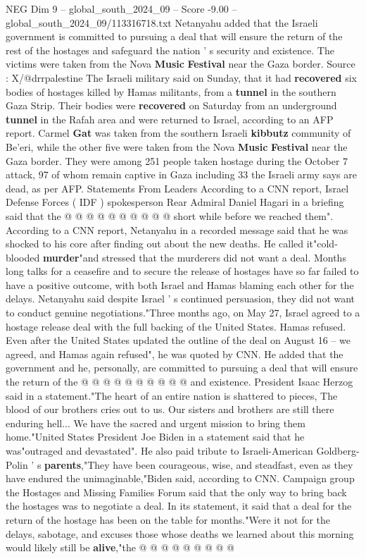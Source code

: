 \begin{textsample}{NEG Dim 9 – global\_south\_2024\_09 – Score -9.00 – global\_south\_2024\_09/113316718.txt}  \label{ex:f9_neg_104}
Netanyahu added that the Israeli government is committed to pursuing a deal that will ensure the return of the rest of the hostages and safeguard the nation ' s security and existence.
The victims were taken from the Nova \textbf{Music} \textbf{Festival} near the Gaza border.
Source : X/@drrpalestine The Israeli military said on Sunday, that it had \textbf{recovered} six bodies of hostages killed by Hamas militants, from a \textbf{tunnel} in the southern Gaza Strip.
Their bodies were \textbf{recovered} on Saturday from an underground \textbf{tunnel} in the Rafah area and were returned to Israel, according to an AFP report.
Carmel \textbf{Gat} was taken from the southern Israeli \textbf{kibbutz} community of Be'eri, while the other five were taken from the Nova \textbf{Music} \textbf{Festival} near the Gaza border.
They were among 251 people taken hostage during the October 7 attack, 97 of whom remain captive in Gaza including 33 the Israeli army says are dead, as per AFP.
Statements From Leaders According to a CNN report, Israel Defense Forces ( IDF ) spokesperson Rear Admiral Daniel Hagari in a briefing said that the @ @ @ @ @ @ @ @ @ @ short while before we reached them".
According to a CNN report, Netanyahu in a recorded message said that he was shocked to his core after finding out about the new deaths.
He called it"cold-blooded \textbf{murder}"and stressed that the murderers did not want a deal.
Months long talks for a ceasefire and to secure the release of hostages have so far failed to have a positive outcome, with both Israel and Hamas blaming each other for the delays.
Netanyahu said despite Israel ' s continued persuasion, they did not want to conduct genuine negotiations."Three months ago, on May 27, Israel agreed to a hostage release deal with the full backing of the United States.
Hamas refused.
Even after the United States updated the outline of the deal on August 16 -- we agreed, and Hamas again refused", he was quoted by CNN.
He added that the government and he, personally, are committed to pursuing a deal that will ensure the return of the @ @ @ @ @ @ @ @ @ @ and existence.
President Isaac Herzog said in a statement."The heart of an entire nation is shattered to pieces, The blood of our brothers cries out to us.
Our sisters and brothers are still there enduring hell...
We have the sacred and urgent mission to bring them home."United States President Joe Biden in a statement said that he was"outraged and devastated".
He also paid tribute to Israeli-American Goldberg-Polin ' s \textbf{parents},"They have been courageous, wise, and steadfast, even as they have endured the unimaginable,"Biden said, according to CNN.
Campaign group the Hostages and Missing Families Forum said that the only way to bring back the hostages was to negotiate a deal.
In its statement, it said that a deal for the return of the hostage has been on the table for months."Were it not for the delays, sabotage, and excuses those whose deaths we learned about this morning would likely still be \textbf{alive},"the @ @ @ @ @ @ @ @ @

\end{textsample}
